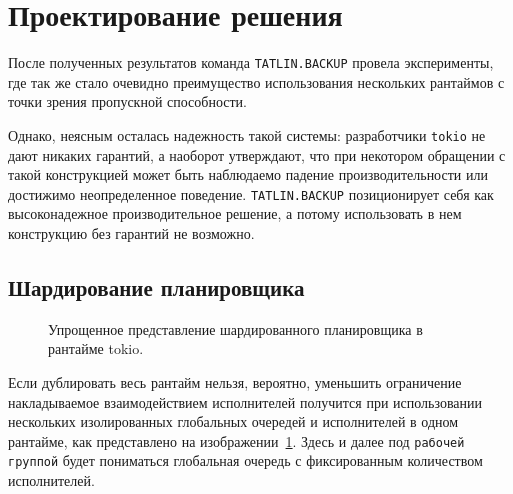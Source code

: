 
\section{Проектирование решения}

После полученных результатов команда \verb|TATLIN.BACKUP| провела эксперименты, где так же стало очевидно преимущество использования нескольких рантаймов с точки зрения пропускной способности.

Однако, неясным осталась надежность такой системы: разработчики \verb|tokio| не дают никаких гарантий, а наоборот утверждают, что при некотором обращении с такой конструкцией может быть наблюдаемо падение производительности или достижимо неопределенное поведение. \verb|TATLIN.BACKUP| позиционирует себя как высоконадежное производительное решение, а потому использовать в нем конструкцию без гарантий не возможно.

\subsection{Шардирование планировщика}

\begin{figure}[H]
    \begin{center}
    \end{center}

    \caption{Упрощенное представление шардированного планировщика в рантайме tokio.}
    \label{fig:tokio:duplicated_arch}
\end{figure}

Если дублировать весь рантайм нельзя, вероятно, уменьшить ограничение накладываемое взаимодействием исполнителей получится при использовании нескольких изолированных  глобальных очередей и исполнителей в одном рантайме, как представлено на изображении~\ref{fig:tokio:duplicated_arch}. Здесь и далее под \verb|рабочей группой| будет пониматься глобальная очередь с фиксированным количеством исполнителей.

